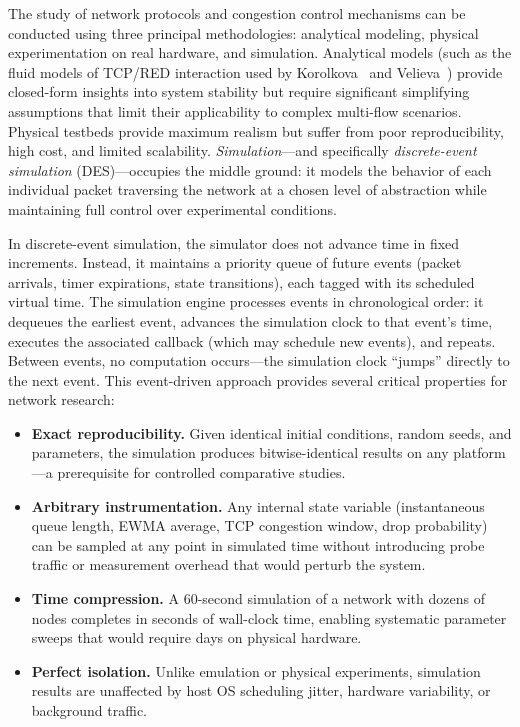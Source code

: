 \documentclass[default]{subfiles}
\begin{document}
{The study of network protocols and congestion control mechanisms can be conducted using three principal methodologies: analytical modeling, physical experimentation on real hardware, and simulation. Analytical models (such as the fluid models of TCP/RED interaction used by Korolkova~\cite{korolkova2010} and Velieva~\cite{velieva2019}) provide closed-form insights into system stability but require significant simplifying assumptions that limit their applicability to complex multi-flow scenarios. Physical testbeds provide maximum realism but suffer from poor reproducibility, high cost, and limited scalability. \textit{Simulation}---and specifically \textit{discrete-event simulation} (DES)---occupies the middle ground: it models the behavior of each individual packet traversing the network at a chosen level of abstraction while maintaining full control over experimental conditions.

In discrete-event simulation, the simulator does not advance time in fixed increments. Instead, it maintains a priority queue of future events (packet arrivals, timer expirations, state transitions), each tagged with its scheduled virtual time. The simulation engine processes events in chronological order: it dequeues the earliest event, advances the simulation clock to that event's time, executes the associated callback (which may schedule new events), and repeats. Between events, no computation occurs---the simulation clock ``jumps'' directly to the next event. This event-driven approach provides several critical properties for network research:
\begin{itemize}
  \item \textbf{Exact reproducibility.} Given identical initial conditions, random seeds, and parameters, the simulation produces bitwise-identical results on any platform---a prerequisite for controlled comparative studies.
  \item \textbf{Arbitrary instrumentation.} Any internal state variable (instantaneous queue length, EWMA average, TCP congestion window, drop probability) can be sampled at any point in simulated time without introducing probe traffic or measurement overhead that would perturb the system.
  \item \textbf{Time compression.} A 60-second simulation of a network with dozens of nodes completes in seconds of wall-clock time, enabling systematic parameter sweeps that would require days on physical hardware.
  \item \textbf{Perfect isolation.} Unlike emulation or physical experiments, simulation results are unaffected by host OS scheduling jitter, hardware variability, or background traffic.
\end{itemize}

}
\end{document}

